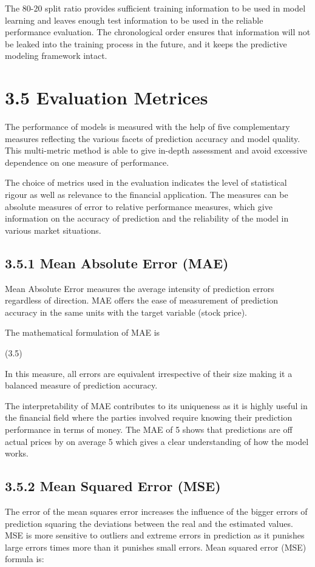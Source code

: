 \documentclass[12pt,a4paper]{report}
\begin{document}
The 80-20 split ratio provides sufficient training information to be used in model learning and leaves enough test information to be used in the reliable performance evaluation. The chronological order ensures that information will not be leaked into the training process in the future, and it keeps the predictive modeling framework intact.

\section{3.5 Evaluation Metrices}
The performance of models is measured with the help of five complementary measures reflecting the various facets of prediction accuracy and model quality. This multi-metric method is able to give in-depth assessment and avoid excessive dependence on one measure of performance.

The choice of metrics used in the evaluation indicates the level of statistical rigour as well as relevance to the financial application. The measures can be absolute measures of error to relative performance measures, which give information on the accuracy of prediction and the reliability of the model in various market situations.

\subsection{3.5.1 Mean Absolute Error (MAE)}
Mean Absolute Error measures the average intensity of prediction errors regardless of direction. MAE offers the ease of measurement of prediction accuracy in the same units with the target variable (stock price).

The mathematical formulation of MAE is 

								(3.5)

In this measure, all errors are equivalent irrespective of their size making it a balanced measure of prediction accuracy.

The interpretability of MAE contributes to its uniqueness as it is highly useful in the financial field where the parties involved require knowing their prediction performance in terms of money. The MAE of 5 shows that predictions are off actual prices by on average 5 which gives a clear understanding of how the model works.

\subsection{3.5.2 Mean Squared Error (MSE)}
The error of the mean squares error increases the influence of the bigger errors of prediction squaring the deviations between the real and the estimated values. MSE is more sensitive to outliers and extreme errors in prediction as it punishes large errors times more than it punishes small errors. Mean squared error (MSE) formula is:
\end{document}
